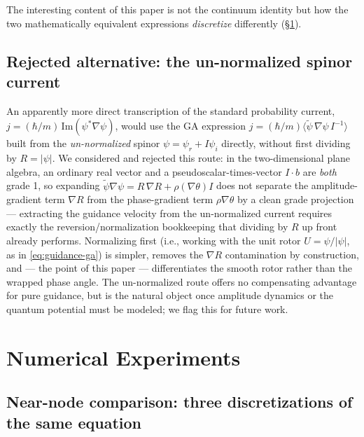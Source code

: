 \documentclass[11pt]{article}
\begin{document}
The interesting content of this paper is not the continuum identity but how the two mathematically equivalent expressions \emph{discretize} differently (\S\ref{sec:results}).

\subsection{Rejected alternative: the un-normalized spinor current}

An apparently more direct transcription of the standard probability current, $j=(\hbar/m)\,\mathrm{Im}(\psi^*\nabla\psi)$, would use the GA expression $j=(\hbar/m)\langle\tilde\psi\,\nabla\psi\,I^{-1}\rangle$ built from the \emph{un-normalized} spinor $\psi=\psi_r+I\psi_i$ directly, without first dividing by $R=|\psi|$. We considered and rejected this route: in the two-dimensional plane algebra, an ordinary real vector and a pseudoscalar-times-vector $I\!\cdot\! b$ are \emph{both} grade 1, so expanding $\tilde\psi\nabla\psi = R\,\nabla R + \rho(\nabla \theta)I$ does not separate the amplitude-gradient term $\nabla R$ from the phase-gradient term $\rho\nabla \theta$ by a clean grade projection — extracting the guidance velocity from the un-normalized current requires exactly the reversion/normalization bookkeeping that dividing by $R$ up front already performs. Normalizing first (i.e., working with the unit rotor $U=\psi/|\psi|$, as in \eqref{eq:guidance-ga}) is simpler, removes the $\nabla R$ contamination by construction, and — the point of this paper — differentiates the smooth rotor rather than the wrapped phase angle. The un-normalized route offers no compensating advantage for pure guidance, but is the natural object once amplitude dynamics or the quantum potential must be modeled; we flag this for future work.

\section{Numerical Experiments}
\label{sec:results}

\subsection{Near-node comparison: three discretizations of the same equation}
\end{document}
